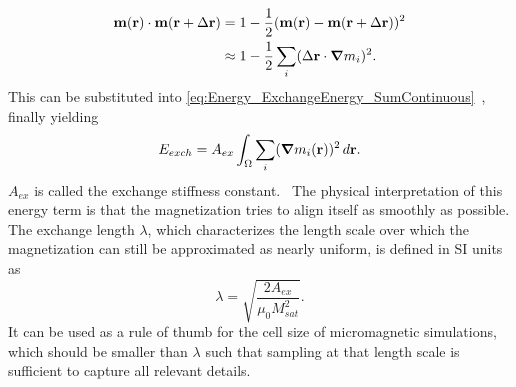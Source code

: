 \documentclass[11pt,a4paper,english]{article}
\begin{document}
\begin{align*}
    \vb{m}(\vb{r}) \cdot \vb{m}(\vb{r} + \Delta\vb{r}) &= 1 - \frac{1}{2}(\vb{m}(\vb{r}) - \vb{m}(\vb{r} + \Delta\vb{r}))^2 \\
    &\approx 1 - \frac{1}{2}\sum_i(\Delta\vb{r} \cdot \gradient{m_i})^2 \label{eq:Energy_ExchangeEnergy_DotApprox} \mathrm{.}
\end{align*}
This can be substituted into \cref{eq:Energy_ExchangeEnergy_SumContinuous}~\cite{abert2013discrete,Gilbert1956}, finally yielding
\begin{equation}
    E_{exch} = A_{ex} \int_\Omega \sum_i (\gradient{m_i}(\vb{r}))^2 \, d\vb{r} \mathrm{.} \label{eq:Energy_Term_Exchange}
\end{equation}
$A_{ex}$ is called the exchange stiffness constant.~\cite{Gilbert1956} The physical interpretation of this energy term is that the magnetization tries to align itself as smoothly as possible.
The exchange length $\lambda$, which characterizes the length scale over which the magnetization can still be approximated as nearly uniform, is defined in SI units \cite{ExchangeLength, ExchangeLength_original, MuMax3} as
\begin{equation}
    \lambda = \sqrt{\frac{2 A_{ex}}{\mu_0 M_{sat}^2}} \mathrm{.}
    \label{eq:Energy_ExchangeEnergy_ExchangeLength}
\end{equation}
It can be used as a rule of thumb for the cell size of micromagnetic simulations, which should be smaller than $\lambda$ such that sampling at that length scale is sufficient to capture all relevant details.~\cite{ExchangeLength}
\end{document}
